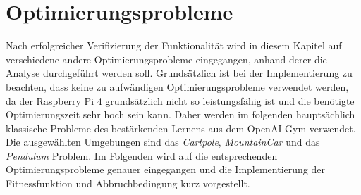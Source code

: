 \section{Optimierungsprobleme}
\label{sec:analysis_optimzation_problems}
Nach erfolgreicher Verifizierung der Funktionalität wird in diesem Kapitel auf verschiedene andere Optimierungsprobleme eingegangen, anhand derer die Analyse durchgeführt werden soll. Grundsätzlich ist bei der Implementierung zu beachten, dass keine zu aufwändigen Optimierungsprobleme verwendet werden, da der Raspberry Pi 4 grundsätzlich nicht so leistungsfähig ist und die benötigte Optimierungszeit sehr hoch sein kann. Daher werden im folgenden hauptsächlich klassische Probleme des bestärkenden Lernens aus dem OpenAI Gym verwendet. Die ausgewählten Umgebungen sind das \emph{Cartpole}, \emph{MountainCar} und das \emph{Pendulum} Problem. Im Folgenden wird auf die entsprechenden Optimierungsprobleme genauer eingegangen und die Implementierung der Fitnessfunktion und Abbruchbedingung kurz vorgestellt. 


